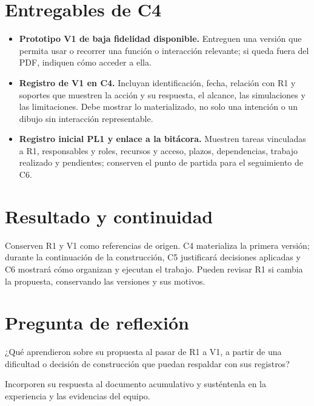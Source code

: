 \section*{Entregables de C4}
\begin{itemize}
\item \textbf{Prototipo V1 de baja fidelidad disponible.} Entreguen una versión que permita usar o recorrer una función o interacción relevante; si queda fuera del PDF, indiquen cómo acceder a ella.
\item \textbf{Registro de V1 en C4.} Incluyan identificación, fecha, relación con R1 y soportes que muestren la acción y su respuesta, el alcance, las simulaciones y las limitaciones. Debe mostrar lo materializado, no solo una intención o un dibujo sin interacción representable.
\item \textbf{Registro inicial PL1 y enlace a la bitácora.} Muestren tareas vinculadas a R1, responsables y roles, recursos y acceso, plazos, dependencias, trabajo realizado y pendientes; conserven el punto de partida para el seguimiento de C6.
\end{itemize}

\section*{Resultado y continuidad}
Conserven R1 y V1 como referencias de origen. C4 materializa la primera versión; durante la continuación de la construcción, C5 justificará decisiones aplicadas y C6 mostrará cómo organizan y ejecutan el trabajo. Pueden revisar R1 si cambia la propuesta, conservando las versiones y sus motivos.

\section*{Pregunta de reflexión}
¿Qué aprendieron sobre su propuesta al pasar de R1 a V1, a partir de una dificultad o decisión de construcción que puedan respaldar con sus registros?

Incorporen su respuesta al documento acumulativo y susténtenla en la experiencia y las evidencias del equipo.


